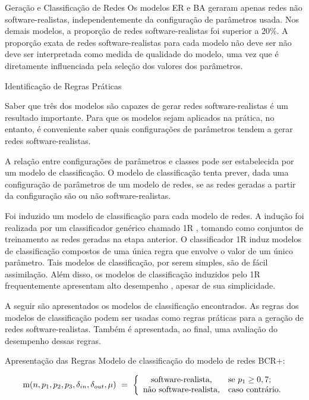 \begin{section}{Geração e Classificação de Redes}
	Os modelos ER e BA geraram apenas redes não software-realistas, independentemente da configuração de parâmetros usada. Nos demais modelos, a proporção de redes software-realistas foi superior a 20\%. A proporção exata de redes software-realistas para cada modelo não deve ser não deve ser interpretada como medida de qualidade do modelo, uma vez que é diretamente influenciada pela seleção dos valores dos parâmetros.

\end{section}

\begin{section}{Identificação de Regras Práticas}
	
	Saber que três dos modelos são capazes de gerar redes software-realistas é um resultado importante. Para que os modelos sejam aplicados na prática, no entanto, é conveniente saber quais configurações de parâmetros tendem a gerar redes software-realistas.
	
	A relação entre configurações de parâmetros e classes pode ser estabelecida por um modelo de classificação. O modelo de classificação tenta prever, dada uma configuração de parâmetros de um modelo de redes, se as redes geradas a partir da configuração são ou não software-realistas.
	
	Foi induzido um modelo de classificação para cada modelo de redes. A indução foi realizada por um classificador genérico chamado 1R \cite{OneR}, tomando como conjuntos de treinamento as redes geradas na etapa anterior. O classificador 1R induz modelos de classificação compostos de uma única regra que envolve o valor de um único parâmetro. Tais modelos de classificação, por serem simples, são de fácil assimilação. Além disso, os modelos de classificação induzidos pelo 1R frequentemente apresentam alto desempenho \cite{OneR}, apesar de sua simplicidade.
	
	A seguir são apresentados os modelos de classificação encontrados. As regras dos modelos de classificação podem ser usadas como regras práticas para a geração de redes software-realistas. Também é apresentada, ao final, uma avaliação do desempenho dessas regras.
	
\begin{subsection}{Apresentação das Regras}
	Modelo de classificação do modelo de redes BCR+:
		
	$$
	\mathrm{m}(n, p_1, p_2, p_3, \delta_{in}, \delta_{out}, \mu) ~=~
	\left\{
	\begin{array}{cl}
	\mbox{software-realista,} & \mbox{se } p_1 \ge 0,7; \\
	\mbox{não software-realista,} & \mbox{caso contrário.}
	\end{array}
	\right.
	$$
	

\end{subsection}
\end{section}
